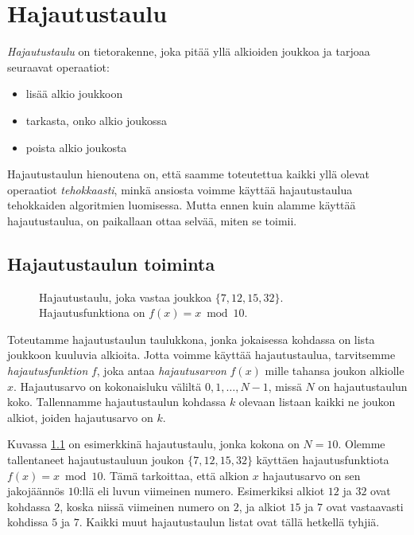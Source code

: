 \chapter{Hajautustaulu}

\emph{Hajautustaulu} on tietorakenne,
joka pitää yllä alkioiden joukkoa ja tarjoaa
seuraavat operaatiot:

\begin{itemize}
\item lisää alkio joukkoon
\item tarkasta, onko alkio joukossa
\item poista alkio joukosta
\end{itemize}

Hajautustaulun hienoutena on, että saamme toteutettua
kaikki yllä olevat operaatiot \emph{tehokkaasti},
minkä ansiosta voimme käyttää hajautustaulua tehokkaiden
algoritmien luomisessa.
Mutta ennen kuin alamme käyttää hajautustaulua,
on paikallaan ottaa selvää, miten se toimii.

\section{Hajautustaulun toiminta}

\begin{figure}
\center
{}
\caption{Hajautustaulu, joka vastaa joukkoa $\{7,12,15,32\}$.
Hajautusfunktiona on $f(x)=x \bmod 10$.}
\label{fig:hajtau}
\end{figure}

Toteutamme hajautustaulun taulukkona,
jonka jokaisessa kohdassa on lista joukkoon kuuluvia alkioita.
Jotta voimme käyttää hajautustaulua,
tarvitsemme \emph{hajautusfunktion} $f$,
joka antaa \emph{hajautusarvon}
$f(x)$ mille tahansa joukon alkiolle $x$.
Hajautusarvo on kokonaisluku väliltä
$0,1,\dots,N-1$, missä $N$ on hajautustaulun koko.
Tallennamme hajautustaulun kohdassa $k$ olevaan listaan
kaikki ne joukon alkiot, joiden hajautusarvo on $k$.

Kuvassa \ref{fig:hajtau} on esimerkkinä hajautustaulu,
jonka kokona on $N=10$.
Olemme tallentaneet hajautustauluun joukon $\{7,12,15,32\}$
käyttäen hajautusfunktiota $f(x)=x \bmod 10$.
Tämä tarkoittaa, että alkion $x$ hajautusarvo on sen jakojäännös $10$:llä
eli luvun viimeinen numero.
Esimerkiksi alkiot $12$ ja $32$ ovat kohdassa $2$,
koska niissä viimeinen numero on $2$,
ja alkiot $15$ ja $7$ ovat vastaavasti kohdissa $5$ ja $7$.
Kaikki muut hajautustaulun listat ovat tällä hetkellä tyhjiä.

